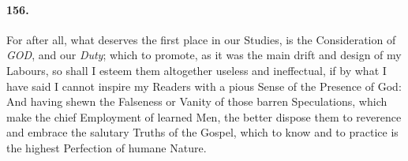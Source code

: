 \documentclass[]{article}
\newenvironment{sectionbody}{}{}
\begin{document}
\begin{sectionbody}
\paragraph{156.} For after all, what deserves the first place in our Studies, is
the Consideration of \emph{GOD}, and our \emph{Duty}; which to
promote, as it was the main drift and design of my Labours, so
shall I esteem them altogether useless and ineffectual, if by
what I have said I cannot inspire my Readers with a pious Sense
of the Presence of {\sc God}: And having shewn the Falseness or
Vanity of those barren Speculations, which make the chief
Employment of learned Men, the better dispose them to reverence
and embrace the salutary Truths of the {\sc Gospel}, which to
know and to practice is the highest Perfection of humane Nature.

\end{sectionbody}
\end{document}
